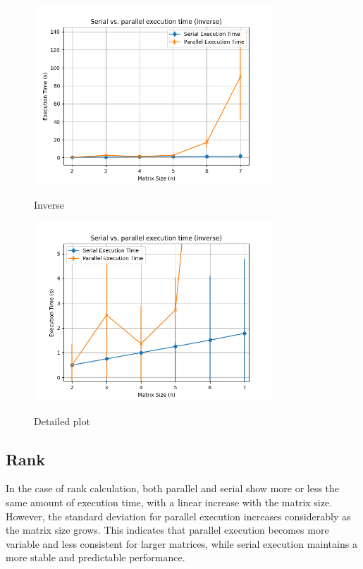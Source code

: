 \begin{figure}[H]
    \includegraphics[width=0.8\textwidth, keepaspectratio]{../img/inv_2_8_3.png}
    \centering
    \label{fig:inv}
    \caption{Inverse}

    \includegraphics[width=0.8\textwidth, keepaspectratio]{../img/inv_2_8_3_detail.png}
    \centering
    \label{fig:inv_detail}
    \caption{Detailed plot}
\end{figure}  

\subsection{Rank}
In the case of rank calculation, both parallel and serial show more or less the same amount of execution time, with a linear increase with the matrix size. However, the standard deviation for parallel execution increases considerably as the matrix size grows. This indicates that parallel execution becomes more variable and less consistent for larger matrices, while serial execution maintains a more stable and predictable performance.


